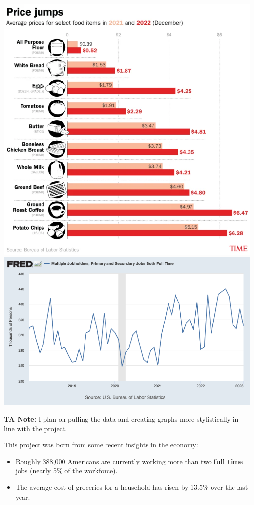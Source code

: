 \documentclass[landscape,a0b,final,a4resizeable]{a0poster}
\newenvironment{poster}{
  \begin{center}
  \begin{minipage}[c]{0.96\textwidth}
}{
  \end{minipage} 
  \end{center}
}
\theoremstyle{definition}
\theoremstyle{remark}
\begin{document}
\begin{poster}
\begin{multicols}{3}
    \begin{center}
      \includegraphics[height=9.5\baselineskip]{figures/food-inflation.png}
      \includegraphics[height=9.5\baselineskip]{figures/two-jobs.png}
    \end{center}

    \textbf{TA Note:} I plan on pulling the data and creating graphs more stylistically in-line with the project.

    \vspace{\baselineskip}

    This project was born from some recent insights in the economy:
    \begin{itemize}
      \item Roughly 388,000 Americans are currently working more than two \textbf{full time} jobs (nearly 5\% of the workforce).
      \item The average cost of groceries for a household has risen by 13.5\% over the last year.
    \end{itemize}


\end{multicols}
\end{poster}
\end{document}
